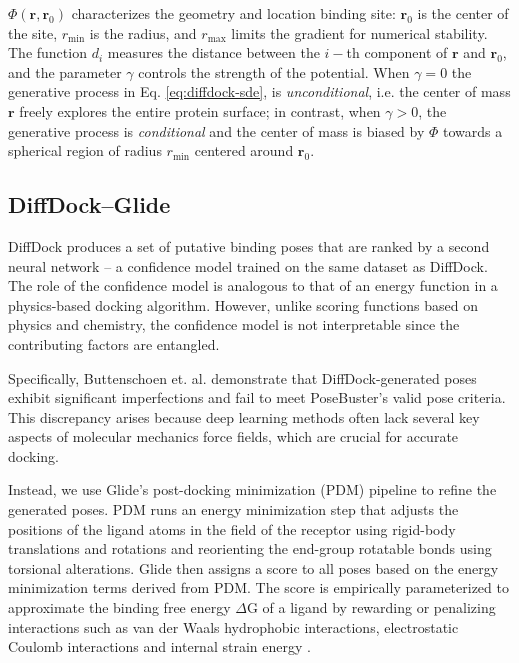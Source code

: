 \documentclass[%
 aip,
 amsmath,amssymb,
 reprint,%
]{revtex4-1}
\begin{document}
$\Phi(\mathbf{r}, \mathbf{r}_0)$ characterizes the geometry and location binding site: $\mathbf{r}_0$ is the center of the site, $r_{\mathrm{min}}$ is the radius, and $r_{\mathrm{max}}$ limits the gradient for numerical stability. The function $d_i$ measures the distance between the $i-$th component of $\mathbf{r}$ and $\mathbf{r}_0$, and the parameter $\gamma$ controls the strength of the potential. When $\gamma=0$ the generative process in Eq. \ref{eq:diffdock-sde}, is {\it unconditional}, i.e. the center of mass $\mathbf{r}$ freely explores the entire protein surface; in contrast, when $\gamma > 0$, the generative process is {\it conditional} and the center of mass is biased by $\Phi$ towards a spherical region of radius $r_\mathrm{min}$ centered around $\mathbf{r}_0$.

\subsection{DiffDock--Glide}
DiffDock produces a set of putative binding poses that are ranked by a second neural network -- a confidence model trained on the same dataset as DiffDock. The role of the confidence model is analogous to that of an energy function in a physics-based docking algorithm. However, unlike scoring functions based on physics and chemistry, the confidence model is not interpretable since the contributing factors are entangled.

Specifically, Buttenschoen et. al.\cite{buttenschoen2024posebusters} demonstrate that DiffDock-generated poses exhibit significant imperfections and fail to meet PoseBuster's valid pose criteria. This discrepancy arises because deep learning methods often lack several key aspects of molecular mechanics force fields, which are crucial for accurate docking.

Instead, we use Glide's post-docking minimization (PDM) pipeline to refine the generated poses. PDM runs an energy minimization step that adjusts the positions of the ligand atoms in the field of the receptor using rigid-body translations and rotations and reorienting the end-group rotatable bonds using torsional alterations. Glide then assigns a score to all poses based on the energy minimization terms derived from PDM. The score is empirically parameterized to approximate the binding free energy $\Delta$G of a ligand by rewarding or penalizing interactions such as van der Waals hydrophobic interactions, electrostatic Coulomb interactions and internal strain energy \cite{friesner2004glide}. 
\end{document}
